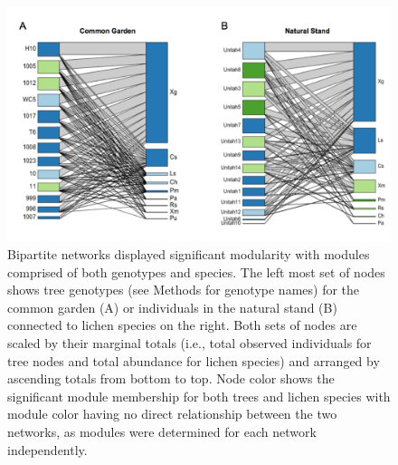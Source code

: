 \documentclass[fleqn,10pt]{wlscirep}
\begin{document}
\begin{figure}[ht]
\centering
\includegraphics[width=\linewidth]{fig3}
\caption{Bipartite networks displayed significant modularity with
  modules comprised of both genotypes and species. The left most set
  of nodes shows tree genotypes (see Methods for genotype names) for
  the common garden (A) or individuals in the natural stand (B)
  connected to lichen species on the right. Both sets of nodes are
  scaled by their marginal totals (i.e., total observed individuals
  for tree nodes and total abundance for lichen species) and arranged
  by ascending totals from bottom to top. Node color shows the
  significant module membership for both trees and lichen species with
  module color having no direct relationship between the two networks,
  as modules were determined for each network independently.}
\label{fig:fig3}
\end{figure}


\end{document}
